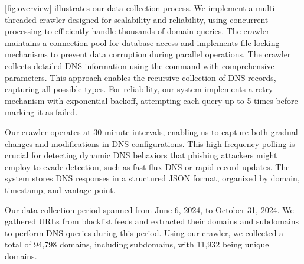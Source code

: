 \autoref{fig:overview} illustrates our data collection process. 
We implement a multi-threaded crawler designed for scalability and reliability, using concurrent processing to efficiently handle thousands of domain queries. The crawler maintains a connection pool for database access and implements file-locking mechanisms to prevent data corruption during parallel operations.
The crawler collects detailed DNS information using the  command with comprehensive parameters. 
This approach enables the recursive collection of DNS records, capturing all possible types. For reliability, our system implements a retry mechanism with exponential backoff, attempting each query up to 5 times before marking it as failed.

Our crawler operates at 30-minute intervals, enabling us to capture both gradual changes and modifications in DNS configurations. This high-frequency polling is crucial for detecting dynamic DNS behaviors that phishing attackers might employ to evade detection, such as fast-flux DNS or rapid record updates.
The system stores DNS responses in a structured JSON format, organized by domain, timestamp, and vantage point.

Our data collection period spanned from June 6, 2024, to October 31, 2024. 
We gathered URLs from blocklist feeds and extracted their domains and subdomains to perform DNS queries during this period. 
Using our crawler, we collected a total of 94,798 domains, including subdomains, with 11,932 being unique domains.





